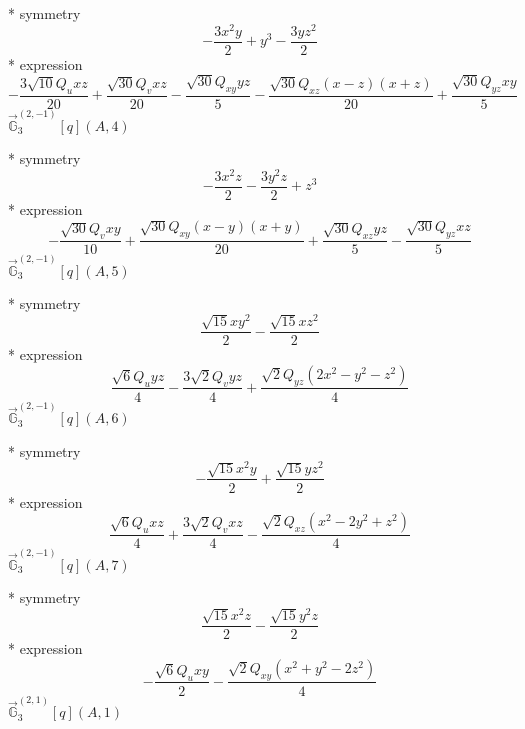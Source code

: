\documentclass[fleqn,8pt]{jsarticle}
\begin{document}
\noindent\quad ** symmetry
\begin{dmath*}
- \frac{3 x^{2} y}{2} + y^{3} - \frac{3 y z^{2}}{2}
\end{dmath*}
\noindent\quad ** expression
\begin{dmath*}
- \frac{3 \sqrt{10} Q_{u} x z}{20} + \frac{\sqrt{30} Q_{v} x z}{20} - \frac{\sqrt{30} Q_{xy} y z}{5} - \frac{\sqrt{30} Q_{xz} \left(x - z\right) \left(x + z\right)}{20} + \frac{\sqrt{30} Q_{yz} x y}{5}
\end{dmath*}
\noindent\quad $\vec{\mathbb{G}}_{3}^{(2,-1)}[q](A,4)$

\noindent\quad ** symmetry
\begin{dmath*}
- \frac{3 x^{2} z}{2} - \frac{3 y^{2} z}{2} + z^{3}
\end{dmath*}
\noindent\quad ** expression
\begin{dmath*}
- \frac{\sqrt{30} Q_{v} x y}{10} + \frac{\sqrt{30} Q_{xy} \left(x - y\right) \left(x + y\right)}{20} + \frac{\sqrt{30} Q_{xz} y z}{5} - \frac{\sqrt{30} Q_{yz} x z}{5}
\end{dmath*}
\noindent\quad $\vec{\mathbb{G}}_{3}^{(2,-1)}[q](A,5)$

\noindent\quad ** symmetry
\begin{dmath*}
\frac{\sqrt{15} x y^{2}}{2} - \frac{\sqrt{15} x z^{2}}{2}
\end{dmath*}
\noindent\quad ** expression
\begin{dmath*}
\frac{\sqrt{6} Q_{u} y z}{4} - \frac{3 \sqrt{2} Q_{v} y z}{4} + \frac{\sqrt{2} Q_{yz} \left(2 x^{2} - y^{2} - z^{2}\right)}{4}
\end{dmath*}
\noindent\quad $\vec{\mathbb{G}}_{3}^{(2,-1)}[q](A,6)$

\noindent\quad ** symmetry
\begin{dmath*}
- \frac{\sqrt{15} x^{2} y}{2} + \frac{\sqrt{15} y z^{2}}{2}
\end{dmath*}
\noindent\quad ** expression
\begin{dmath*}
\frac{\sqrt{6} Q_{u} x z}{4} + \frac{3 \sqrt{2} Q_{v} x z}{4} - \frac{\sqrt{2} Q_{xz} \left(x^{2} - 2 y^{2} + z^{2}\right)}{4}
\end{dmath*}
\noindent\quad $\vec{\mathbb{G}}_{3}^{(2,-1)}[q](A,7)$

\noindent\quad ** symmetry
\begin{dmath*}
\frac{\sqrt{15} x^{2} z}{2} - \frac{\sqrt{15} y^{2} z}{2}
\end{dmath*}
\noindent\quad ** expression
\begin{dmath*}
- \frac{\sqrt{6} Q_{u} x y}{2} - \frac{\sqrt{2} Q_{xy} \left(x^{2} + y^{2} - 2 z^{2}\right)}{4}
\end{dmath*}
\noindent\quad $\vec{\mathbb{G}}_{3}^{(2,1)}[q](A,1)$
\end{document}
